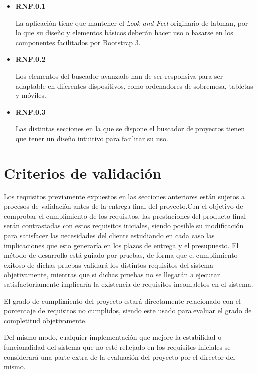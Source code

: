 \begin{itemize}
	\item \textbf{RNF.0.1}

	La aplicación tiene que mantener el \textit{Look and Feel} originario de \acrshort{labman}, por lo que su diseño y elementos básicos deberán hacer uso o basarse en los componentes facilitados por Bootstrap 3.

	\item \textbf{RNF.0.2}

	Los elementos del buscador avanzado han de ser responsiva para ser adaptable en diferentes dispositivos, como ordenadores de sobremesa, tabletas y móviles.

	\item \textbf{RNF.0.3}

	Las distintas secciones en la que se dispone el buscador de proyectos tienen que tener un diseño intuitivo para facilitar su uso.
\end{itemize}


\section{Criterios de validación}

Los requisitos previamente expuestos en las secciones anteriores están sujetos a procesos de validación antes de la entrega final del proyecto.Con el objetivo de comprobar el cumplimiento de los requisitos, las prestaciones del producto final serán contrastadas con estos requisitos iniciales, siendo posible su modificación para satisfacer las necesidades del cliente estudiando en cada caso las implicaciones que esto generaría en los plazos de entrega y el presupuesto. El método de desarrollo está guiado por pruebas, de forma que el cumplimiento exitoso de dichas pruebas validará los distintos requisitos del sistema objetivamente, mientras que si dichas pruebas no se llegarán a ejecutar satisfactoriamente implicaría la existencia de requisitos incompletos en el sistema.

El grado de cumplimiento del proyecto estará directamente relacionado con el porcentaje de requisitos no cumplidos, siendo este usado para evaluar el grado de completitud objetivamente.

Del mismo modo, cualquier implementación que mejore la estabilidad o funcionalidad del sistema que no esté reflejado en los requisitos iniciales se considerará una parte extra de la evaluación del proyecto por el director del mismo.
